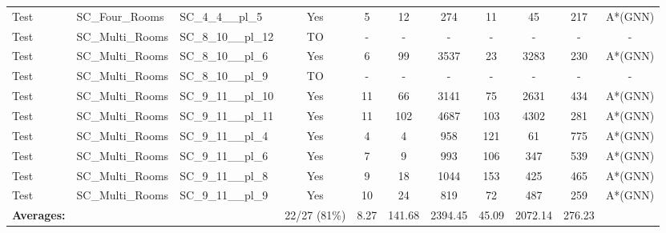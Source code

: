 \documentclass{article}
\begin{document}
\begin{tabular}{lllcccccccc}
Test & SC\_Four\_Rooms & SC\_4\_4\_\_pl\_5 & Yes & 5 & 12 & 274 & 11 & 45 & 217 & A*(GNN) \\
Test & SC\_Multi\_Rooms & SC\_8\_10\_\_pl\_12 & TO & - & - & - & - & - & - & - \\
Test & SC\_Multi\_Rooms & SC\_8\_10\_\_pl\_6 & Yes & 6 & 99 & 3537 & 23 & 3283 & 230 & A*(GNN) \\
Test & SC\_Multi\_Rooms & SC\_8\_10\_\_pl\_9 & TO & - & - & - & - & - & - & - \\
Test & SC\_Multi\_Rooms & SC\_9\_11\_\_pl\_10 & Yes & 11 & 66 & 3141 & 75 & 2631 & 434 & A*(GNN) \\
Test & SC\_Multi\_Rooms & SC\_9\_11\_\_pl\_11 & Yes & 11 & 102 & 4687 & 103 & 4302 & 281 & A*(GNN) \\
Test & SC\_Multi\_Rooms & SC\_9\_11\_\_pl\_4 & Yes & 4 & 4 & 958 & 121 & 61 & 775 & A*(GNN) \\
Test & SC\_Multi\_Rooms & SC\_9\_11\_\_pl\_6 & Yes & 7 & 9 & 993 & 106 & 347 & 539 & A*(GNN) \\
Test & SC\_Multi\_Rooms & SC\_9\_11\_\_pl\_8 & Yes & 9 & 18 & 1044 & 153 & 425 & 465 & A*(GNN) \\
Test & SC\_Multi\_Rooms & SC\_9\_11\_\_pl\_9 & Yes & 10 & 24 & 819 & 72 & 487 & 259 & A*(GNN) \\
\textbf{Averages:} & & & 22/27 (81\%) & 8.27 & 141.68 & 2394.45 & 45.09 & 2072.14 & 276.23 & \\
\bottomrule
\end{tabular}
\newpage
\end{document}
